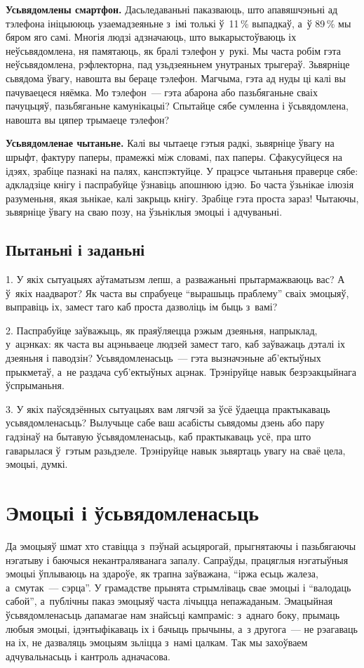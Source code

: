 \textbf{Усьвядомлены смартфон.} Дасьледаваньні паказваюць, што апавяшчэньні ад тэлефона ініцыююць узаемадзеяньне з~імі толькі ў~11\,\% выпадкаў, а~ў 89\,\% мы бяром яго самі. Многія людзі адзначаюць, што выкарыстоўваюць іх неўсьвядомлена, ня памятаюць, як бралі тэлефон у~рукі. Мы часта робім гэта неўсьвядомлена, рэфлекторна, пад узьдзеяньнем унутраных трыгераў. Зьвярніце сьвядома ўвагу, навошта вы бераце тэлефон. Магчыма, гэта ад нуды ці калі вы пачуваецеся няёмка. Мо тэлефон~--- гэта абарона або пазьбяганьне сваіх пачуцьцяў, пазьбяганьне камунікацыі? Спытайце сябе сумленна і ўсьвядомлена, навошта вы цяпер трымаеце тэлефон?

\textbf{Усьвядомленае чытаньне.} Калі вы чытаеце гэтыя радкі, зьвярніце ўвагу на шрыфт, фактуру паперы, прамежкі між словамі, пах паперы. Сфакусуйцеся на ідэях, зрабіце пазнакі на палях, канспэктуйце. У працэсе чытаньня праверце сябе: адкладзіце кнігу і паспрабуйце ўзнавіць апошнюю ідэю. Бо часта ўзьнікае ілюзія разуменьня, якая зьнікае, калі закрыць кнігу. Зрабіце гэта проста зараз! Чытаючы, зьвярніце ўвагу на сваю позу, на ўзьніклыя эмоцыі і адчуваньні.

\subsection*{Пытаньні і заданьні}

1. У якіх сытуацыях аўтаматызм лепш, а~разважаньні прытармажваюць вас? А ў~якіх наадварот? Як часта вы спрабуеце ``вырашыць праблему'' сваіх эмоцыяў, выправіць іх, замест таго каб проста дазволіць ім быць з~вамі?

2. Паспрабуйце заўважыць, як праяўляецца рэжым дзеяньня, напрыклад, у~ацэнках: як часта вы ацэньваеце людзей замест таго, каб заўважаць дэталі іх дзеяньня і паводзін? Усьвядомленасьць~--- гэта вызначэньне аб'ектыўных прыкметаў, а~не раздача суб'ектыўных ацэнак. Трэніруйце навык безрэакцыйнага ўспрыманьня.

3. У якіх паўсядзённых сытуацыях вам лягчэй за ўсё ўдаецца практыкаваць усьвядомленасьць? Вылучыце сабе ваш асабісты сьвядомы дзень або пару гадзінаў на бытавую ўсьвядомленасьць, каб практыкаваць усё, пра што гаварылася ў~гэтым разьдзеле. Трэніруйце навык зьвяртаць увагу на сваё цела, эмоцыі, думкі.


\section{Эмоцыі і ўсьвядомленасьць}

Да эмоцыяў шмат хто ставіцца з~пэўнай асьцярогай, прыгнятаючы і пазьбягаючы нэгатыву і баючыся некантраляванага запалу. Сапраўды, працяглыя нэгатыўныя эмоцыі ўплываюць на здароўе, як трапна заўважана, ``іржа есьць жалеза, а~смутак~--- сэрца''. У грамадстве прынята стрымліваць свае эмоцыі і ``валодаць сабой'', а~публічны паказ эмоцыяў часта лічыцца непажаданым. Эмацыйная ўсьвядомленасьць дапамагае нам знайсьці кампраміс: з~аднаго боку, прымаць любыя эмоцыі, ідэнтыфікаваць іх і бачыць прычыны, а~з другога~--- не рэагаваць на іх, не дазваляць эмоцыям зьліцца з~намі цалкам. Так мы захоўваем адчувальнасьць і кантроль адначасова.

